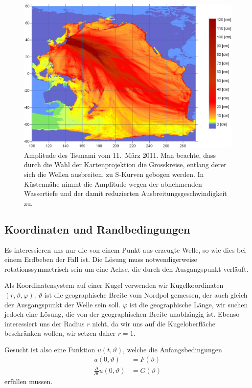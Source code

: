 \begin{figure}
\begin{center}
\includegraphics[width=\hsize]{../common/graphics/sendaienergy}
\end{center}
\caption{Amplitude des Tsunami vom 11.~März 2011.
Man beachte, dass durch die Wahl der Kartenprojektion 
die Grosskreise, entlang derer sich die Wellen ausbreiten,
zu S-Kurven gebogen werden. In Küstennähe nimmt die
Amplitude wegen der abnehmenden Wassertiefe und der damit
reduzierten Ausbreitungsgeschwindigkeit zu.
\label{tsunamienergie}}
\end{figure}


\subsection{Koordinaten und Randbedingungen}
Es interessieren uns nur die von einem Punkt aus erzeugte Welle,
so wie dies bei einem Erdbeben der Fall ist. Die Lösung muss
notwendigerweise rotationssymmetrisch sein um eine Achse, die
durch den Ausgangspunkt verläuft. 

Als Koordinatensystem auf einer Kugel verwenden wir Kugelkoordinaten
$(r,\vartheta,\varphi)$. $\vartheta$ ist die geographische Breite
vom Nordpol gemessen, der auch gleich der Ausgangspunkt der
Welle sein soll. $\varphi$ ist die geographische Länge, wir
suchen jedoch eine Lösung, die von der geographischen Breite
unabhängig ist. Ebenso interessiert uns der Radius $r$ nicht,
da wir uns auf die Kugeloberfläche beschränken wollen, wir
setzen daher $r=1$.

Gesucht ist also eine Funktion $u(t,\vartheta)$, welche die
Anfangsbedingungen
\begin{align*}
u(0,\vartheta)&=F(\vartheta)\\
\frac{\partial}{\partial t}u(0,\vartheta)&=G(\vartheta)
\end{align*}
erfüllen müssen.

